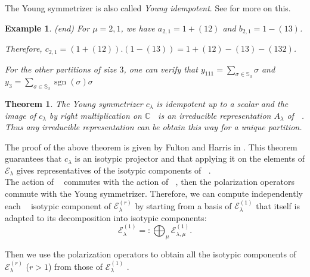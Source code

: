 \documentclass[letter,12pt]{article}
\newcommand{\pauline}[1]{\todo[linecolor=blue,backgroundcolor=blue!25,bordercolor=blue]{#1}}
\newcommand{\CC}{\mathbb{C}}
\newcommand{\Sym}[1]{\mathbb{S}_{#1}}
\DeclareMathOperator{\Sn}{\mathbb{S}_n}
\DeclareMathOperator{\GLr}{GL_r}
\DeclareMathOperator{\sgn}{sgn}
\newtheorem{theorem}{Theorem}
\newtheorem{example}{Example}
\begin{document}
	The Young symmetrizer is also called \emph{Young idempotent}. See \cite{FultonHarris1991} for more on this. 
	
	\addtocounter{example}{-1}
	\begin{example} (end) 
		For $\mu=2,1$, we have
		$a_{2,1} = 1 + (12)$ and
		$b_{2,1} = 1 - (13)$. 
		
		Therefore, $c_{2,1} = (1 + (12)) . (1 - (13)) = 1 + (12) - (13) - (132)$. 
		
		For the other partitions of size $3$, one can verify that 
		$y_{111} = \sum_{\sigma \in \Sym{3}} \sigma$ and 
		$y_{3} = \sum_{\sigma \in \Sym{3}} \sgn(\sigma)\sigma$
	\end{example}
	
	\begin{theorem}
		The Young symmetrizer $c_{\lambda}$ is idempotent up to a scalar and the image of $c_{\lambda}$ by right multiplication on $\CC \Sn$ is an irreducible representation $A_{\lambda}$ of $\Sn$.
		Thus any irreducible representation can be obtain this way for a unique partition. 
	\end{theorem}
	
	The proof of the above theorem is given by Fulton and Harris in \cite{FultonHarris1991}. 
	This theorem guarantees that $c_{\lambda}$ is an isotypic projector and that applying it on the elements of $\mathcal{E}_{\lambda}$ gives representatives of the isotypic components of $\Sn$. \pauline{Need more details here!}  \\
	
	The action of $\GLr$ commutes with the action of $\Sn$, then the polarization operators commute with the Young symmetrizer. Therefore, we can compute independently each $\Sn$ isotypic component of $\mathcal{E}_\lambda^{(r)}$ by starting from a basis of $\mathcal{E}_\lambda^{(1)}$ that itself is adapted to its decomposition into isotypic components:
	$$\mathcal{E}_\lambda^{(1)}=:\bigoplus_\mu \mathcal{E}_{\lambda,\mu}^{(1)}.$$
	
	Then we use the polarization operators to obtain all the isotypic components of $\mathcal{E}_\lambda^{(r)}$ ($r>1$) from those of $\mathcal{E}_\lambda^{(1)}$ .
	
\end{document}
